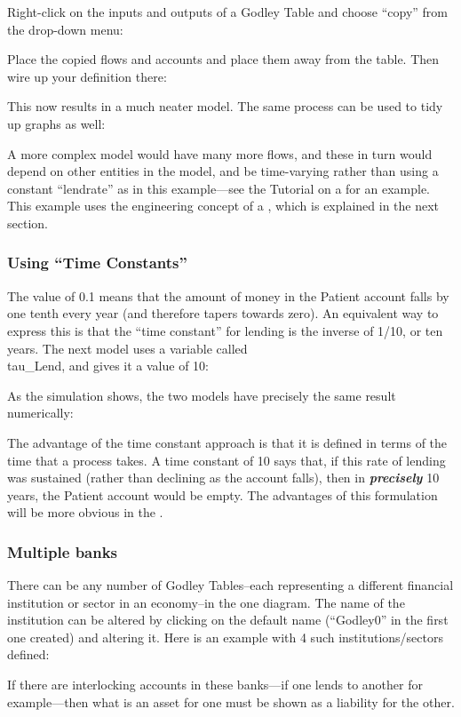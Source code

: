 Right-click on the inputs and outputs of a Godley Table and choose
``copy'' from the drop-down menu:



Place the copied flows and accounts and place them away from the
table. Then wire up your definition there:



This now results in a much neater model. The same process can be used
to tidy up graphs as well:



A more complex model would have many more flows, and these in turn
would depend on other entities in the model, and be time-varying
rather than using a constant ``lendrate'' as in this example---see the
Tutorial on a  for an
example. This example uses the engineering concept of a
, which is explained in the
next section. 

\subsubsection{Using ``Time Constants''}
\label{time-constants}

The value of 0.1 means that the amount of money in the Patient account
falls by one tenth every year (and therefore tapers towards zero). An
equivalent way to express this is that the ``time constant'' for
lending is the inverse of 1/10, or ten years. The next model uses a
variable called \\tau\_Lend, and gives it a value of 10: 


As the simulation shows, the two models have precisely the same result
numerically:



The advantage of the time constant approach is that it is defined in
terms of the time that a process takes. A time constant of 10 says
that, if this rate of lending was sustained (rather than declining as
the account falls), then in {\bf\em precisely} 10 years, the Patient account
would be empty. The advantages of this formulation will be more
obvious in the .


\subsubsection{Multiple banks}

There can be any number of Godley Tables--each representing a
different financial institution or sector in an economy--in the one
diagram. The name of the institution can be altered by clicking on the
default name (``Godley0'' in the first one created) and altering
it. Here is an example with 4 such institutions/sectors defined:



If there are interlocking accounts in these banks---if one lends to
another for example---then what is an asset for one must be shown as a
liability for the other. 
